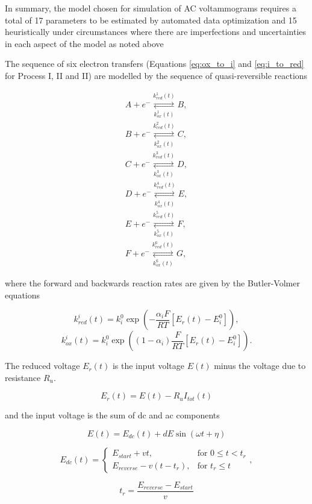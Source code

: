 \documentclass[a4paper, 12pt]{article}
\begin{document}
In summary, the model chosen for simulation of AC voltammograms requires a total 
of 17 parameters to be estimated by automated data optimization and 15 
heuristically under circumstances where there are imperfections and 
uncertainties in each aspect of the model as noted above 

The sequence of six electron transfers (Equations \ref{eq:ox_to_i} and 
\ref{eq:i_to_red} for Process I, II and II) are modelled by the sequence of 
quasi-reversible reactions

\begin{align} \label{eq:reaction}
    A + e^- \underset{k^1_{ox}(t)}{\overset{k^1_{red}(t)}{\rightleftarrows}} B, 
    \\
    B + e^- \underset{k^2_{ox}(t)}{\overset{k^2_{red}(t)}{\rightleftarrows}} C, 
    \\
    C + e^- \underset{k^3_{ox}(t)}{\overset{k^3_{red}(t)}{\rightleftarrows}} D, 
    \\
    D + e^- \underset{k^4_{ox}(t)}{\overset{k^4_{red}(t)}{\rightleftarrows}} E, 
    \\
    E + e^- \underset{k^5_{ox}(t)}{\overset{k^5_{red}(t)}{\rightleftarrows}} F, 
    \\
    F + e^-  \underset{k^6_{ox}(t)}{\overset{k^6_{red}(t)}{\rightleftarrows}} G,
\end{align}

where the forward and backwards reaction rates are given by the Butler-Volmer 
equations

$$ \label{eq:rate1}
k^i_{red}(t) = k^0_i \exp\left(-\frac{\alpha_i F}{RT} [E_r(t) - E^0_i] \right),
$$
$$ \label{eq:rate2}
k^i_{ox}(t) = k^0_i \exp\left((1-\alpha_i)\frac{F}{RT} [E_r(t) - E^0_i] \right).
$$

The reduced voltage $E_r(t)$ is the input voltage $E(t)$ minus the voltage due 
to resistance $R_u$.

$$
E_r(t) = E(t) - R_u I_{tot}(t)
$$

and the input voltage is the sum of dc and ac components

$$
E(t) = E_{dc}(t) + dE\sin(\omega t + \eta)
$$

$$
E_{dc}(t) = \left. \begin{cases} E_{start} + vt, & \text{for } 0 \le t < t_r\\
E_{reverse} - v(t-t_r), & \text{for } t_r \le t
\end{cases} \right. ,
$$

$$
t_r = \frac{E_{reverse}-E_{start}}{v}
$$
\end{document}
